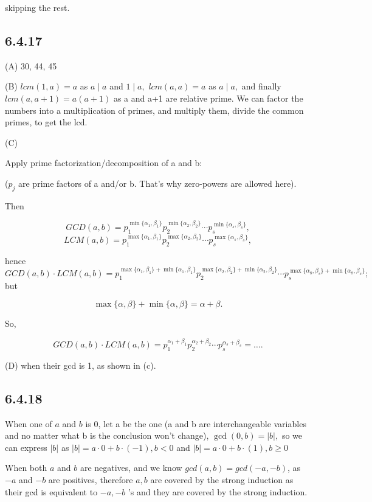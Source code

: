 \documentclass{article}
\begin{document}
skipping the rest.

\subsection*{6.4.17}

(A) 30, 44, 45

(B) $lcm(1,a)=a$ as $a\mid a$ and $1\mid a,$ $lcm(a,a)=a$ as $a\mid a,$ and finally $lcm(a,a+1)=a(a+1)$ as a and a+1 are relative prime.  We can factor the numbers into a multiplication of primes, and multiply them, divide the common primes, to get the lcd. 

(C) 

Apply prime factorization/decomposition of a and b:

($p_j$ are prime factors of a and/or b. That's why zero-powers are allowed here).

Then

$$
GCD(a,b)=p_1^{\min\{\alpha_1,\beta_1\}}p_2^{\min\{\alpha_2,\beta_2\}}\cdots p_s^{\min\{\alpha_s,\beta_s\}},
$$
$$
LCM(a,b)=p_1^{\max\{\alpha_1,\beta_1\}}p_2^{\max\{\alpha_2,\beta_2\}}\cdots p_s^{\max\{\alpha_s,\beta_s\}},
$$

hence
$$
GCD(a,b)\cdot LCM(a,b)=p_1^{\max\{\alpha_1,\beta_1\}+\min\{\alpha_1,\beta_1\}}p_2^{\max\{\alpha_2,\beta_2\}+\min\{\alpha_2,\beta_2\}}\cdots p_s^{\max\{\alpha_8,\beta_s\}+\min\{\alpha_8,\beta_s\}};
$$but

$$
\max\{\alpha,\beta\}+\min\{\alpha,\beta\}=\alpha+\beta.
$$

So,

$$
GCD(a,b)\cdot LCM(a,b)=p_1^{\alpha_1+\beta_1}p_2^{\alpha_2+\beta_2}\cdots p_s^{\alpha_s+\beta_s}=\ldots.
$$





(D) when their gcd is 1, as shown in (c). 

\subsection*{6.4.18}

When one of $a$ and $b$ is 0, let a be the one (a and b are interchangeable variables and no matter what b is the conclusion won't change), $\gcd(0,b)=|b|,$ so we can express $|b|$ as $|b|=a\cdot0+b\cdot(-1),b<0$ and $|b|=a\cdot0+b\cdot(1),b\geq0$

When both $a$ and $b$ are negatives, and we know $gcd(a,b)=gcd(-a,-b)$, as $-a$ and $-b$ are positives, therefore $a,b$ are covered by the strong induction as their gcd is equivalent to $-a,-b$ 's and they are covered by the strong induction. 
\end{document}
